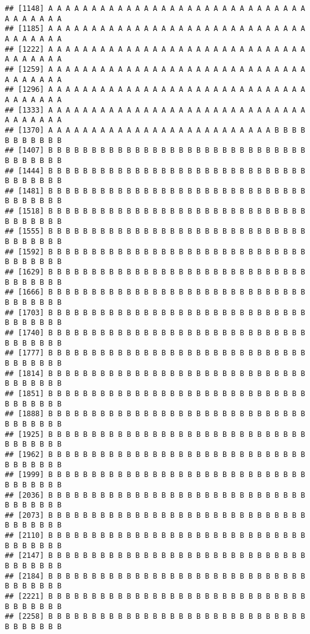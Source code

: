 \documentclass[]{article}
\begin{document}
\begin{verbatim}
## [1148] A A A A A A A A A A A A A A A A A A A A A A A A A A A A A A A A A A A A A
## [1185] A A A A A A A A A A A A A A A A A A A A A A A A A A A A A A A A A A A A A
## [1222] A A A A A A A A A A A A A A A A A A A A A A A A A A A A A A A A A A A A A
## [1259] A A A A A A A A A A A A A A A A A A A A A A A A A A A A A A A A A A A A A
## [1296] A A A A A A A A A A A A A A A A A A A A A A A A A A A A A A A A A A A A A
## [1333] A A A A A A A A A A A A A A A A A A A A A A A A A A A A A A A A A A A A A
## [1370] A A A A A A A A A A A A A A A A A A A A A A A A A A B B B B B B B B B B B
## [1407] B B B B B B B B B B B B B B B B B B B B B B B B B B B B B B B B B B B B B
## [1444] B B B B B B B B B B B B B B B B B B B B B B B B B B B B B B B B B B B B B
## [1481] B B B B B B B B B B B B B B B B B B B B B B B B B B B B B B B B B B B B B
## [1518] B B B B B B B B B B B B B B B B B B B B B B B B B B B B B B B B B B B B B
## [1555] B B B B B B B B B B B B B B B B B B B B B B B B B B B B B B B B B B B B B
## [1592] B B B B B B B B B B B B B B B B B B B B B B B B B B B B B B B B B B B B B
## [1629] B B B B B B B B B B B B B B B B B B B B B B B B B B B B B B B B B B B B B
## [1666] B B B B B B B B B B B B B B B B B B B B B B B B B B B B B B B B B B B B B
## [1703] B B B B B B B B B B B B B B B B B B B B B B B B B B B B B B B B B B B B B
## [1740] B B B B B B B B B B B B B B B B B B B B B B B B B B B B B B B B B B B B B
## [1777] B B B B B B B B B B B B B B B B B B B B B B B B B B B B B B B B B B B B B
## [1814] B B B B B B B B B B B B B B B B B B B B B B B B B B B B B B B B B B B B B
## [1851] B B B B B B B B B B B B B B B B B B B B B B B B B B B B B B B B B B B B B
## [1888] B B B B B B B B B B B B B B B B B B B B B B B B B B B B B B B B B B B B B
## [1925] B B B B B B B B B B B B B B B B B B B B B B B B B B B B B B B B B B B B B
## [1962] B B B B B B B B B B B B B B B B B B B B B B B B B B B B B B B B B B B B B
## [1999] B B B B B B B B B B B B B B B B B B B B B B B B B B B B B B B B B B B B B
## [2036] B B B B B B B B B B B B B B B B B B B B B B B B B B B B B B B B B B B B B
## [2073] B B B B B B B B B B B B B B B B B B B B B B B B B B B B B B B B B B B B B
## [2110] B B B B B B B B B B B B B B B B B B B B B B B B B B B B B B B B B B B B B
## [2147] B B B B B B B B B B B B B B B B B B B B B B B B B B B B B B B B B B B B B
## [2184] B B B B B B B B B B B B B B B B B B B B B B B B B B B B B B B B B B B B B
## [2221] B B B B B B B B B B B B B B B B B B B B B B B B B B B B B B B B B B B B B
## [2258] B B B B B B B B B B B B B B B B B B B B B B B B B B B B B B B B B B B B B

\end{verbatim}
\end{document}
